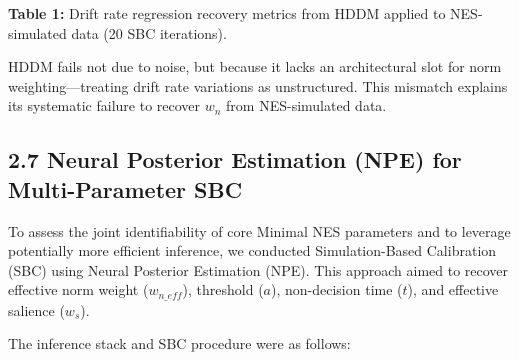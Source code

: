 \documentclass[
  11pt,
]{article}
\begin{document}
\textbf{Table 1:} Drift rate regression recovery metrics from HDDM
applied to NES-simulated data (20 SBC iterations).

HDDM fails not due to noise, but because it lacks an architectural slot
for norm weighting---treating drift rate variations as unstructured.
This mismatch explains its systematic failure to recover \(w_n\) from
NES-simulated data.

\subsection{2.7 Neural Posterior Estimation (NPE) for Multi-Parameter
SBC}\label{neural-posterior-estimation-npe-for-multi-parameter-sbc}

To assess the joint identifiability of core Minimal NES parameters and
to leverage potentially more efficient inference, we conducted
Simulation-Based Calibration (SBC) using Neural Posterior Estimation
(NPE). This approach aimed to recover effective norm weight
(\(w_{n\_eff}\)), threshold (\(a\)), non-decision time (\(t\)), and
effective salience (\(w_s\)).

The inference stack and SBC procedure were as follows:
\end{document}
